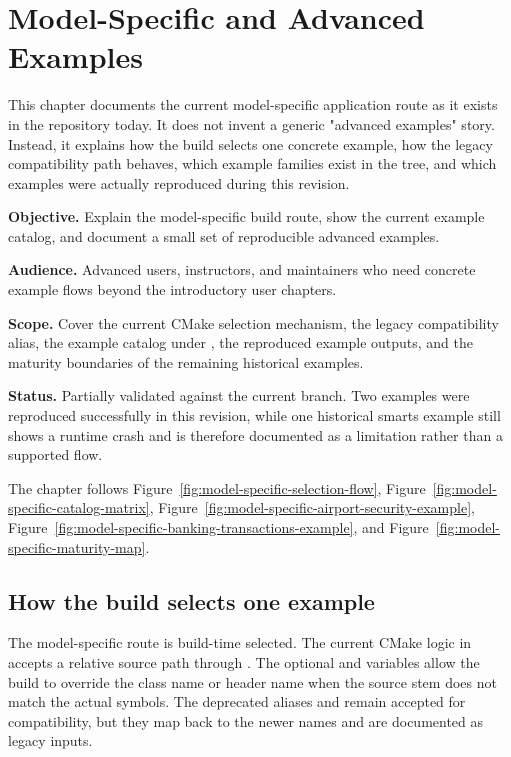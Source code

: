\chapter{Model-Specific and Advanced Examples}
\label{chap:model-specific-and-advanced-examples}

This chapter documents the current model-specific application route as it
exists in the repository today. It does not invent a generic "advanced
examples" story. Instead, it explains how the build selects one concrete
example, how the legacy compatibility path behaves, which example families
exist in the tree, and which examples were actually reproduced during this
revision.

\noindent\textbf{Objective.} Explain the model-specific build route, show the
current example catalog, and document a small set of reproducible advanced
examples.

\noindent\textbf{Audience.} Advanced users, instructors, and maintainers who
need concrete example flows beyond the introductory user chapters.

\noindent\textbf{Scope.} Cover the current CMake selection mechanism, the
legacy compatibility alias, the example catalog under
, the reproduced example outputs, and
the maturity boundaries of the remaining historical examples.

\noindent\textbf{Status.} Partially validated against the current branch. Two
examples were reproduced successfully in this revision, while one historical
smarts example still shows a runtime crash and is therefore documented as a
limitation rather than a supported flow.

The chapter follows Figure~\ref{fig:model-specific-selection-flow},
Figure~\ref{fig:model-specific-catalog-matrix},
Figure~\ref{fig:model-specific-airport-security-example},
Figure~\ref{fig:model-specific-banking-transactions-example}, and
Figure~\ref{fig:model-specific-maturity-map}.

\section{How the build selects one example}
\label{sec:model-specific-selection}

The model-specific route is build-time selected. The current CMake logic in
 accepts a relative
source path through . The optional
 and
 variables allow the build to override
the class name or header name when the source stem does not match the actual
symbols. The deprecated aliases
 and
 remain accepted for compatibility, but
they map back to the newer names and are documented as legacy inputs.


